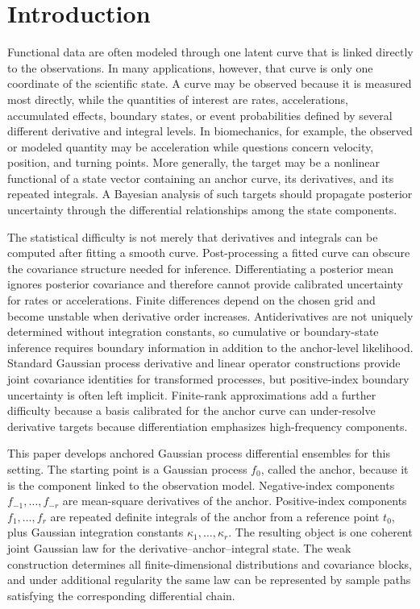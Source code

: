 \documentclass[11pt,a4paper]{article}
\theoremstyle{definition}
\theoremstyle{remark}
\begin{document}
\section{Introduction}
Functional data are often modeled through one latent curve that is linked directly to the observations. In many applications, however, that curve is only one coordinate of the scientific state. A curve may be observed because it is measured most directly, while the quantities of interest are rates, accelerations, accumulated effects, boundary states, or event probabilities defined by several different derivative and integral levels. In biomechanics, for example, the observed or modeled quantity may be acceleration while questions concern velocity, position, and turning points. More generally, the target may be a nonlinear functional of a state vector containing an anchor curve, its derivatives, and its repeated integrals. A Bayesian analysis of such targets should propagate posterior uncertainty through the differential relationships among the state components.

The statistical difficulty is not merely that derivatives and integrals can be computed after fitting a smooth curve. Post-processing a fitted curve can obscure the covariance structure needed for inference.  Differentiating a posterior mean ignores posterior covariance and therefore cannot provide calibrated uncertainty for rates or accelerations.  Finite differences depend on the chosen grid and become unstable when derivative order increases.  Antiderivatives are not uniquely determined without integration constants, so cumulative or boundary-state inference requires boundary information in addition to the anchor-level likelihood.  Standard Gaussian process derivative and linear operator constructions provide joint covariance identities for transformed processes, but positive-index boundary uncertainty is often left implicit.  Finite-rank approximations add a further difficulty because a basis calibrated for the anchor curve can under-resolve derivative targets because differentiation emphasizes high-frequency components.

This paper develops anchored Gaussian process differential ensembles for this setting. The starting point is a Gaussian process \(f_0\), called the anchor, because it is the component linked to the observation model. Negative-index components \(f_{-1},\ldots,f_{-r}\) are mean-square derivatives of the anchor. Positive-index components \(f_1,\ldots,f_r\) are repeated definite integrals of the anchor from a reference point \(t_0\), plus Gaussian integration constants \(\kappa_1,\ldots,\kappa_r\).  The resulting object is one coherent joint Gaussian law for the derivative--anchor--integral state.  The weak construction determines all finite-dimensional distributions and covariance blocks, and under additional regularity the same law can be represented by sample paths satisfying the corresponding differential chain.
\end{document}

